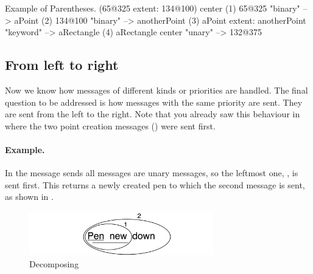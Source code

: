 \documentclass[a4paper,10pt,twoside]{book}
\begin{document}
\begin{example}[decExtent]{Example of Parentheses.}{}
      (65@325 extent: 134@100) center
(1)   65@325                                                    "binary"
    --> aPoint
(2)                                134@100                     "binary"
                                 --> anotherPoint
(3)   aPoint extent: anotherPoint                       "keyword"
      --> aRectangle
(4)   aRectangle center                                     "unary"
      --> 132@375
\end{example}

\subsection{From left to right}
Now we know how messages of different kinds or priorities are handled. The final question to be addressed is how messages with the same priority are sent. They are sent from the left to the right. Note that you already saw this behaviour in  where the two point creation messages () were sent first.



\paragraph{Example.} In the message sends  all messages are unary messages, so the leftmost one, , is sent first. This returns a newly created pen to which the second message  is sent, as shown in .

\begin{figure}
	\centering
	\includegraphics[width=8cm]{ucompoUn}
	\caption{Decomposing }
\end{figure}
\end{document}
